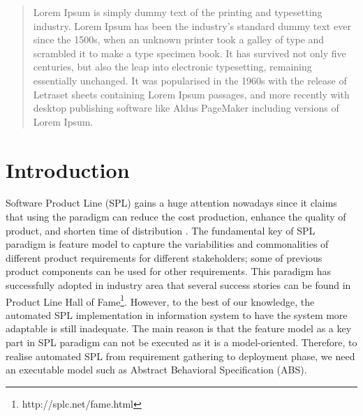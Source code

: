 \documentclass[conference]{IEEEtran}
\begin{document}




\maketitle

\begin{abstract}
Lorem Ipsum is simply dummy text of the printing and typesetting industry. Lorem Ipsum has been the industry's standard dummy text ever since the 1500s, when an unknown printer took a galley of type and scrambled it to make a type specimen book. It has survived not only five centuries, but also the leap into electronic typesetting, remaining essentially unchanged. It was popularised in the 1960s with the release of Letraset sheets containing Lorem Ipsum passages, and more recently with desktop publishing software like Aldus PageMaker including versions of Lorem Ipsum.
\end{abstract}





%
\IEEEpeerreviewmaketitle

\section{Introduction} \label{introduction}
Software Product Line (SPL) gains a huge attention nowadays since it claims that using the paradigm can reduce the cost production, enhance the quality of product, and shorten time of distribution \cite{pohl:SPLE}. The fundamental key of SPL paradigm is feature model to capture the variabilities and commonalities of different product requirements for different stakeholders; some of previous product components can be used for other requirements. This paradigm has successfully adopted in industry area that several success stories can be found in Product Line Hall of Fame\footnote{http://splc.net/fame.html}. However, to the best of our knowledge, the automated SPL implementation in information system to have the system more adaptable is still inadequate. The main reason is that the feature model as a key part in SPL paradigm can not be executed as it is a model-oriented. Therefore, to realise automated SPL from requirement gathering to deployment phase, we need an executable model such as Abstract Behavioral Specification (ABS).
\end{document}
